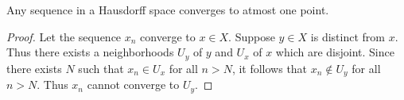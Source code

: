 \begin{theorem}
  Any sequence in a Hausdorff space converges to atmost one point.
\end{theorem}
\begin{proof}
  Let the sequence $x_n$ converge to $x\in X$. Suppose $y\in X$ is distinct from $x$. Thus there exists a neighborhoods $U_y$ of $y$ and $U_x$ of $x$ which are disjoint. Since there exists $N$ such that $x_n\in U_x$ for all $n>N$, it follows that $x_n \notin U_y$ for all $n>N$. Thus $x_n$ cannot converge to $U_y$.
\end{proof}
